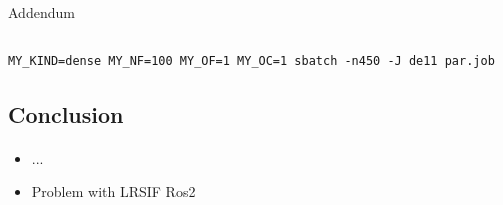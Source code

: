 \begin{frame}[b,fragile,label=speedup]{\secname}
\begin{columns}[c,onlytextwidth]
\begin{block}{Addendum}
\begin{itemize}
  \end{itemize}
  \end{block}
  {\hfill\hyperlink{app:rail1357}{}}
  \vspace{-\baselineskip}
  \end{columns}
  \onslide
  \vfill
  \begin{lstlisting}
MY_KIND=dense MY_NF=100 MY_OF=1 MY_OC=1 sbatch -n450 -J de11 par.job
  \end{lstlisting}
\end{frame}

\subsection{Conclusion}

\begin{frame}[label=conclusion]{\secname}
\framesubtitle{\subsecname}
  \begin{itemize}
    \item
      ...
    \item
      Problem with LRSIF Ros2
  \end{itemize}
\end{frame}
